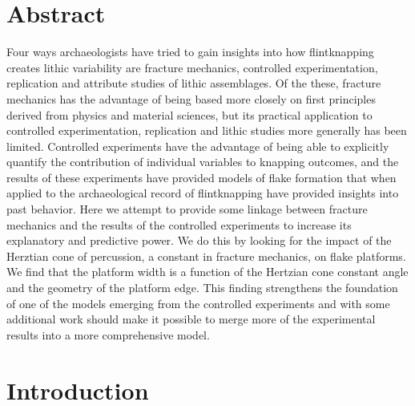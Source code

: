 \documentclass[10pt,letterpaper]{article}
\begin{document}
\section*{Abstract}
Four ways archaeologists have tried to gain insights into how
flintknapping creates lithic variability are fracture mechanics,
controlled experimentation, replication and attribute studies of lithic
assemblages. Of the these, fracture mechanics has the advantage of being
based more closely on first principles derived from physics and material
sciences, but its practical application to controlled experimentation,
replication and lithic studies more generally has been limited.
Controlled experiments have the advantage of being able to explicitly
quantify the contribution of individual variables to knapping outcomes,
and the results of these experiments have provided models of flake
formation that when applied to the archaeological record of
flintknapping have provided insights into past behavior. Here we attempt
to provide some linkage between fracture mechanics and the results of
the controlled experiments to increase its explanatory and predictive
power. We do this by looking for the impact of the Herztian cone of
percussion, a constant in fracture mechanics, on flake platforms. We
find that the platform width is a function of the Hertzian cone constant
angle and the geometry of the platform edge. This finding strengthens
the foundation of one of the models emerging from the controlled
experiments and with some additional work should make it possible to
merge more of the experimental results into a more comprehensive model.


\linenumbers

\hypertarget{introduction}{%
\section{Introduction}\label{introduction}}
\end{document}
